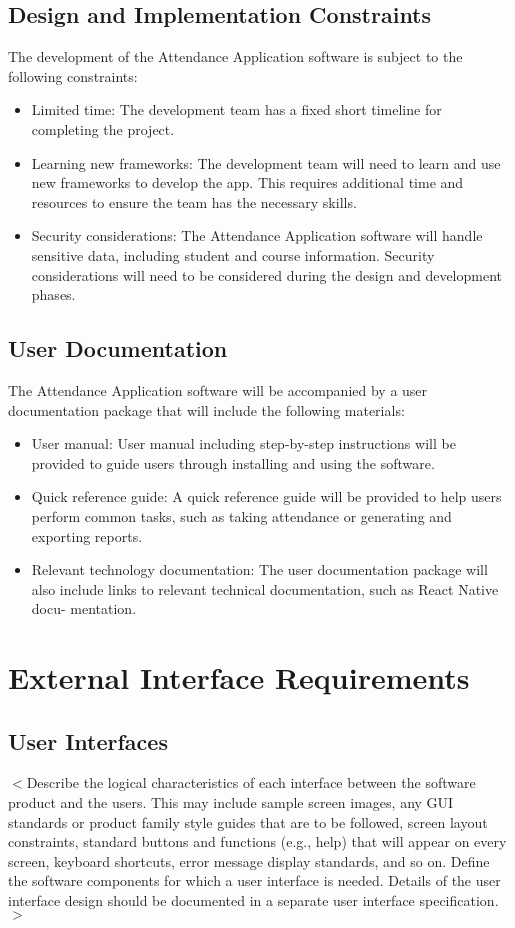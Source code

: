 \documentclass{scrreprt}
\begin{document}
\section{Design and Implementation Constraints}
The development of the Attendance Application software is subject to the following constraints:
\begin{itemize}
\item Limited time: The development team has a fixed short timeline for completing the
project.
\item Learning new frameworks: The development team will need to learn and use new
frameworks to develop the app. This requires
additional time and resources to ensure the team has the necessary skills.
\item Security considerations: The Attendance Application software will handle sensitive data, including student and course information. Security considerations will need to be considered during the design and development phases.
\end{itemize}

\section{User Documentation}
The Attendance Application software will be accompanied by a user documentation package that will include the following materials:
\begin{itemize}
\item User manual: User manual including step-by-step instructions will be provided to guide users through
installing and using the software.
\item Quick reference guide: A quick reference guide will be provided to help users
perform common tasks, such as taking attendance or generating and exporting reports.
\item Relevant technology documentation: The user documentation package will also
include links to relevant technical documentation, such as React Native docu-
mentation.
\end{itemize}


\chapter{External Interface Requirements}

\section{User Interfaces}
$<$Describe the logical characteristics of each interface between the software 
product and the users. This may include sample screen images, any GUI standards 
or product family style guides that are to be followed, screen layout 
constraints, standard buttons and functions (e.g., help) that will appear on 
every screen, keyboard shortcuts, error message display standards, and so on.  
Define the software components for which a user interface is needed. Details of 
the user interface design should be documented in a separate user interface 
specification.$>$
\end{document}
